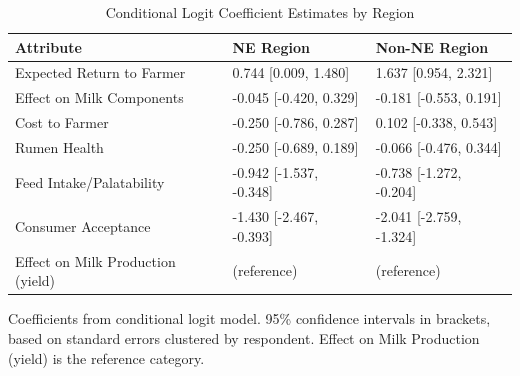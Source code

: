 \begin{table}[!h]
\centering
\caption{\label{tab:bws_robustness_regional}Conditional Logit Coefficient Estimates by Region}
\centering
\begin{threeparttable}
\begin{tabular}[t]{lll}
\toprule
Attribute & NE Region & Non-NE Region\\
\midrule
Expected Return to Farmer & 0.744 [0.009, 1.480] & 1.637 [0.954, 2.321]\\
Effect on Milk Components & -0.045 [-0.420, 0.329] & -0.181 [-0.553, 0.191]\\
Cost to Farmer & -0.250 [-0.786, 0.287] & 0.102 [-0.338, 0.543]\\
Rumen Health & -0.250 [-0.689, 0.189] & -0.066 [-0.476, 0.344]\\
Feed Intake/Palatability & -0.942 [-1.537, -0.348] & -0.738 [-1.272, -0.204]\\
\addlinespace
Consumer Acceptance & -1.430 [-2.467, -0.393] & -2.041 [-2.759, -1.324]\\
Effect on Milk Production (yield) & (reference) & (reference)\\
\bottomrule
\end{tabular}
\begin{tablenotes}
\item Coefficients from conditional logit model. 95\% confidence intervals in brackets, based on standard errors clustered by respondent. Effect on Milk Production (yield) is the reference category.
\end{tablenotes}
\end{threeparttable}
\end{table}
